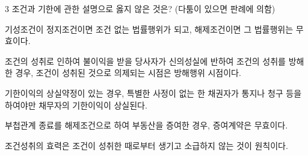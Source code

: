 \begin{question}{3}
조건과 기한에 관한 설명으로 옳지 않은 것은? (다툼이 있으면 판례에 의함)
\begin{choices}
  \item 기성조건이 정지조건이면 조건 없는 법률행위가 되고, 해제조건이면 그 법률행위는 무효이다.
  \item 조건의 성취로 인하여 불이익을 받을 당사자가 신의성실에 반하여 조건의 성취를 방해한 경우, 조건이 성취된 것으로 의제되는 시점은 방해행위 시점이다.
  \item 기한이익의 상실약정이 있는 경우, 특별한 사정이 없는 한 채권자가 통지나 청구 등을 하여야만 채무자의 기한이익이 상실된다.
  \item 부첩관계 종료를 해제조건으로 하여 부동산을 증여한 경우, 증여계약은 무효이다.
  \item 조건성취의 효력은 조건이 성취한 때로부터 생기고 소급하지 않는 것이 원칙이다.
\end{choices}
\end{question}
